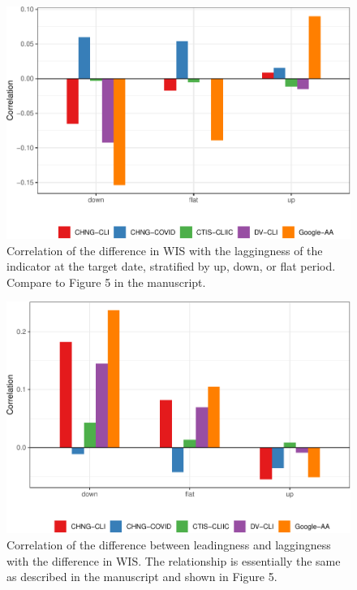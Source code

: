 \documentclass[9pt,twoside,lineno]{pnas-new}
\begin{document}
\clearpage

\begin{figure}

{\centering \includegraphics[width=\textwidth]{fig/lagging-only-1} 

}

\caption{Correlation of the difference in WIS with the  laggingness of the indicator at the target date, stratified by up, down, or flat period. Compare to Figure 5 in the manuscript.}\label{fig:lagging-only}
\end{figure}

\clearpage

\begin{figure}

{\centering \includegraphics[width=\textwidth]{fig/diff-in-lead-lag-1} 

}

\caption{Correlation of the difference between leadingness and laggingness with the difference in WIS. The relationship is essentially the same as described in the manuscript and shown in Figure 5.}\label{fig:diff-in-lead-lag}
\end{figure}
\end{document}
